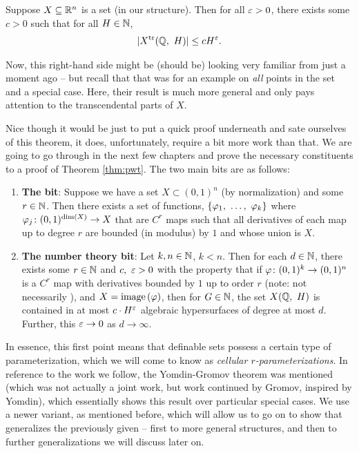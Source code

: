   \begin{theorem}
    Suppose $\XRn[X]{n}$ is a  set (in our \om structure). Then for all $\eps > 0$, there exists some $c > 0$ such that for all $H \in \N$,
      \begin{align*}
        \card{\XtrQH[H]} \leq \bound[H].
      \end{align*}
      \label{thm:pwt}
  \end{theorem}

  Now, this right-hand side might be (should be) looking very familiar from just a moment ago -- but recall that that was for an example on \emph{all} points in the set and a special case. Here, their result is much more general and only pays attention to the transcendental parts of $X$.

  Nice though it would be just to put a quick proof underneath and sate ourselves of this theorem, it does, unfortunately, require a bit more work than that. We are going to go through in the next few chapters and prove the necessary constituents to a proof of Theorem \ref{thm:pwt}. The two main bits are as follows:
  \begin{enumerate}

    \item \textbf{The \om bit}: Suppose we have a  set $X \subset (0, 1)^n$ (by normalization) and some $r \in \N$. Then there exists a set of functions, $\{ \vonevm{\phi}{k} \}$ where $\funcdom{\phi_j}{(0, 1)^{\dim{X}}}{X}$ that are $C^r$  maps such that all derivatives of each map up to degree $r$ are bounded (in modulus) by $1$ and whose union is $X$.
    \label{pw_proof:pt1}

    \item \textbf{The number theory bit}: Let $k, n \in \N$, $k < n$. Then for each $d \in \N$, there exists some $r \in \N$ and $c, \ \eps > 0$ with the property that if $\funcdom{\phi}{(0, 1)^k}{(0, 1)^n}$ is a $C^r$ map with derivatives bounded by $1$ up to order $r$ (note: not necessarily ), and $X = \image{\phi}$, then for $G \in \N$, the set $\XQH[H]$ is contained in at most $c \cdot H^{\eps}$ algebraic hypersurfaces of degree at most $d$. Further, this $\eps \to 0$ as $d \to \infty$.
    \label{pw_proof:pt2}

  \end{enumerate}

In essence, this first point means that definable sets possess a certain type of parameterization, which we will come to know as \emph{cellular $r$-parameterizations}. In reference to the work we follow, the Yomdin-Gromov theorem was mentioned (which was not actually a joint work, but work continued by Gromov, inspired by Yomdin), which essentially shows this result over particular special cases. We use a newer variant, as mentioned before, which will allow us to go on to show that \pw generalizes the previously given -- first to more general \om structures, and then to further generalizations we will discuss later on.


